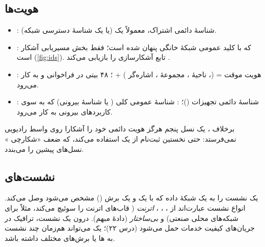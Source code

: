 \documentclass[11pt,a4paper]{article}
\begin{document}
\subsection{هویت‌ها}
\begin{itemize}
  \item \textbf{}: شناسهٔ دائمی اشتراک، معمولاً یک  (یا یک شناسهٔ دسترسی شبکه).
  \item \textbf{}:  که با کلید عمومی شبکهٔ خانگی پنهان شده است؛ فقط بخش مسیریابی آشکار است
        (\cref{fig:ids}). تابع آشکارسازی   را بازیابی می‌کند \cite{ts33501}.
  \item \textbf{}: هویت موقت =  (، ناحیهٔ ، مجموعهٔ ، اشاره‌گر ) +
        ؛  ۴۸ بیتی در فراخوانی و  به کار می‌رود.
  \item \textbf{}: شناسهٔ دائمی تجهیزات ()؛ \textbf{}: شناسهٔ عمومی کلی ( یا شناسهٔ
        بیرونی) که به سوی کاربردهای بیرونی به کار می‌رود.
\end{itemize}
برخلاف ، یک  نسل پنجم هرگز هویت دائمی خود را آشکارا روی واسط رادیویی نمی‌فرستد: حتی نخستین ثبت‌نام از یک
 استفاده می‌کند، که ضعف «شکارچی » نسل‌های پیشین را می‌بندد.

\begin{acnfigure}
  \caption{ساختار  و .}
  \label{fig:ids}
\end{acnfigure}

\subsection{نشست‌های }
یک نشست   را به یک شبکهٔ داده که با یک  و یک برش () مشخص می‌شود وصل می‌کند. انواع
نشست عبارت‌اند از ، ، ، \emph{اترنت} ( قاب‌های اترنت را سوئیچ می‌کند، مثلاً برای
شبکه‌های محلی صنعتی) و \emph{بی‌ساختار} (دادهٔ مبهم). درون یک نشست، ترافیک در جریان‌های کیفیت خدمات حمل می‌شود (درس ۲۲)؛ یک
 می‌تواند هم‌زمان چند نشست به ها یا برش‌های مختلف داشته باشد.
\end{document}
